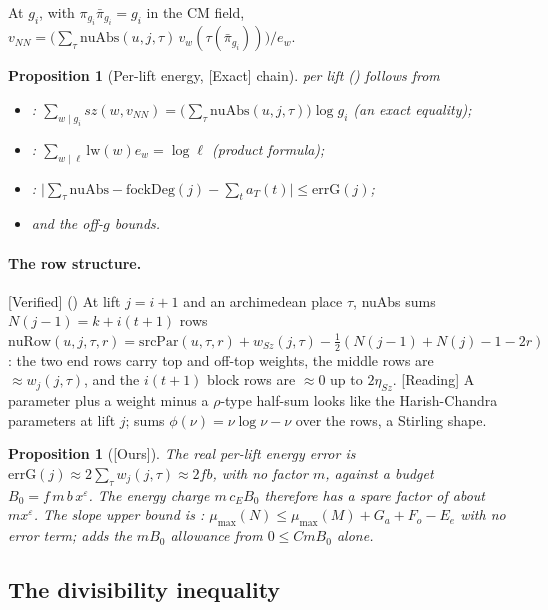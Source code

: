 \documentclass[11pt]{article}
\newcommand{\Exact}{\textcolor{exactc}{\textsf{\small[Exact]}}}
\newcommand{\Verified}{\textcolor{verc}{\textsf{\small[Verified]}}}
\newcommand{\Reading}{\textcolor{readc}{\textsf{\small[Reading]}}}
\newcommand{\Ours}{\textcolor{oursc}{\textsf{\small[Ours]}}}
\newcommand{\eps}{\varepsilon}
\theoremstyle{plain}
\newtheorem{proposition}[theorem]{Proposition}
\theoremstyle{definition}
\begin{document}
At $g_i$, with $\pi_{g_i}\bar\pi_{g_i}=g_i$ in the CM field,
$v_{NN}=\bigl(\sum_\tau \mathrm{nuAbs}(u,j,\tau)\,v_w(\tau(\bar\pi_{g_i}))\bigr)/e_w$.

\begin{proposition}[Per-lift energy, \Exact{} chain]
 per lift () follows from
\begin{itemize}
\item {}: $\sum_{w\mid g_i} sz(w,v_{NN}) = \bigl(\sum_\tau\mathrm{nuAbs}(u,j,\tau)\bigr)\log g_i$ (an exact equality);
\item {}: $\sum_{w\mid \ell}\mathrm{lw}(w)e_w = \log \ell$ (product formula);
\item {}: $\bigl|\sum_\tau\mathrm{nuAbs} - \mathrm{fockDeg}(j) - \sum_t a_T(t)\bigr|\le \mathrm{errG}(j)$;
\item {} and the off-$g$ bounds.
\end{itemize}
\end{proposition}

\paragraph{The row structure.} \Verified{} () At lift $j=i+1$ and an
archimedean place $\tau$, nuAbs sums $N(j-1)=k+i(t+1)$ rows
$\mathrm{nuRow}(u,j,\tau,r)=\mathrm{srcPar}(u,\tau,r)+w_{Sz}(j,\tau)-\tfrac12(N(j-1)+N(j)-1-2r)$:
the two end rows carry top and off-top weights, the middle rows are $\approx w_j(j,\tau)$, and the
$i(t+1)$ block rows are $\approx 0$ up to $2\eta_{Sz}$.
\Reading{} A parameter plus a weight minus a $\rho$-type half-sum looks like the Harish-Chandra
parameters at lift $j$;  sums $\phi(\nu)=\nu\log\nu-\nu$ over the rows, a Stirling
shape.

\begin{proposition}[\Ours]
The real per-lift energy error is $\mathrm{errG}(j)\approx 2\sum_\tau w_j(j,\tau)\approx 2fb$,
with no factor $m$, against a budget $B_0=f\,m\,b\,x^\eps$. The energy charge $m\,c_E B_0$ therefore
has a spare factor of about $m x^\eps$. The slope upper bound is :
$\mu_{\max}(N)\le\mu_{\max}(M)+G_a+F_o-E_e$ with \emph{no} error term;  adds the
$m B_0$ allowance from $0\le C m B_0$ alone.
\end{proposition}

\subsection{The divisibility inequality}
\end{document}
